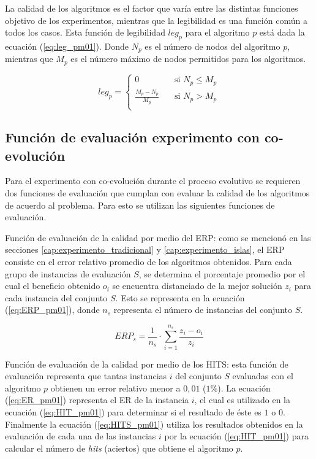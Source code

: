 La calidad de los algoritmos es el factor que varía entre las distintas funciones objetivo de los experimentos, mientras que la legibilidad es una función común a todos los casos. Esta función de legibilidad $leg_{p}$ para el algoritmo $p$ está dada la ecuación (\ref{eq:leg_pm01}). Donde $N_{p}$ es el número de nodos del algoritmo $p$, mientras que $M_{p}$ es el número máximo de nodos permitidos para los algoritmos.

\begin{equation}
\label{eq:leg_pm01}
	leg_{p} = 	\begin{cases}
					0       & \quad \text{si } N_{p} \leq M_{p} \\
					\frac{M_{p}-N_{p}}{M_{p}}  & \quad \text{si } N_{p} > M_{p}\\
				\end{cases}
\end{equation}

\subsection{Función de evaluación experimento con co-evolución}
\label{cap:fo_coev}

Para el experimento con co-evolución durante el proceso evolutivo se requieren dos funciones de evaluación que cumplan con evaluar la calidad de los algoritmos de acuerdo al problema. Para esto se utilizan las siguientes funciones de evaluación.

Función de evaluación de la calidad por medio del ERP: como se mencionó en las secciones \ref{cap:experimento_tradicional} y \ref{cap:experimento_islas}, el ERP consiste en el error relativo promedio de los algoritmos obtenidos. Para cada grupo de instancias de evaluación $S$, se determina el porcentaje promedio por el cual el beneficio obtenido $o_{i}$ se encuentra distanciado de la mejor solución $z_{i}$ para cada instancia del conjunto $S$. Esto se representa en la ecuación (\ref{eq:ERP_pm01}), donde $n_{s}$ representa el número de instancias del conjunto $S$.

\begin{equation}
\label{eq:ERP_pm01}
	ERP_{s} =  \frac{1}{n_{s}} \cdot \sum\limits_{i=1}^{n_{s}} \frac{z_{i} - o_{i}}{z_{i}} 
\end{equation}

Función de evaluación de la calidad por medio de los HITS: esta función de evaluación representa que tantas instancias $i$ del conjunto $S$ evaluadas con el algoritmo $p$ obtienen un error relativo menor a $0,01$ ($1\%$). La ecuación (\ref{eq:ER_pm01}) representa el ER de la instancia $i$, el cual es utilizado en la ecuación (\ref{eq:HIT_pm01}) para determinar si el resultado de éste es $1$ o $0$. Finalmente la ecuación (\ref{eq:HITS_pm01}) utiliza los resultados obtenidos en la evaluación de cada una de las instancias $i$ por la ecuación (\ref{eq:HIT_pm01}) para calcular el número de \textit{hits} (aciertos) que obtiene el algoritmo $p$.

